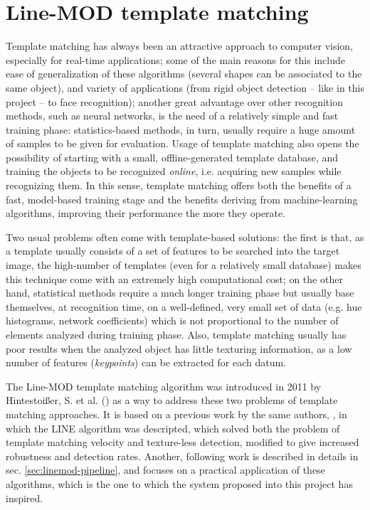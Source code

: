 \section{Line-MOD template matching} \label{sec:linemod}
Template matching has always been an attractive approach to computer vision,
especially for real-time applications; some of the main reasons for this
include ease of generalization of
these algorithms (several shapes can be associated to the same object), and
variety of applications (from rigid object detection -- like in this project --
to face recognition); another great advantage over other recognition methods,
such as neural networks, is the need of a relatively simple and fast training phase:
statistics-based methods, in turn, usually require a huge amount 
of samples to be given for evaluation. Usage of template matching also opens
the possibility of starting with a small, offline-generated template database, and training the
objects to be recognized \emph{online}, i.e. acquiring new samples while
recognizing them. In this sense, template matching offers both the benefits of
a fast, model-based training stage and the benefits deriving from
machine-learning algorithms, improving their performance the more they operate.

Two usual problems often come with template-based solutions: the first is that,
as a template usually consists of a set of features to be searched into the
target image, the high-number of templates (even for a relatively small
database) makes this technique come with an extremely high computational cost;
on the other hand, statistical methods require a much longer training phase but
usually base themselves, at recognition time, on a well-defined, very small set of
data (e.g. hue histograms, network coefficients) which is not proportional to the number of elements
analyzed during training phase. Also, template matching usually has poor
results when the analyzed object has little texturing information, as a low
number of features (\emph{keypoints}) can be extracted for each datum.

The Line-MOD template matching algorithm was introduced in 2011 by
Hintestoi{\ss}er, S. et al. (\cite{linemod-paper}) as a way to address these
two problems of template matching approaches. It is based on a previous work by
the same authors, \cite{linemod-origins}, in which the LINE algorithm was
descripted, which solved both the problem of template matching velocity and
texture-less detection, modified to give increased robustness and detection
rates. Another, following work is described in details in sec.
\ref{sec:linemod-pipeline}, and focuses on a practical application of these
algorithms, which is the one to which the system proposed into this project has
inspired.

